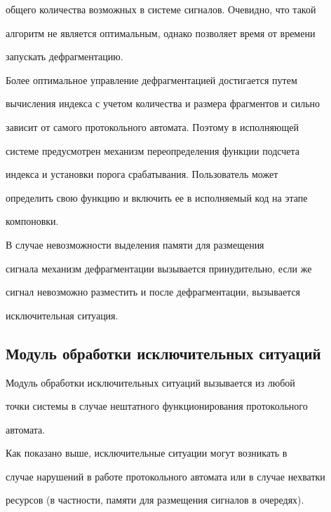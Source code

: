 общего количества возможных в системе сигналов. Очевидно, что такой 


алгоритм не является оптимальным, однако позволяет время от времени 


запускать дефрагментацию.


      


      Более оптимальное управление дефрагментацией достигается путем 


вы\-чис\-ле\-ния индекса с учетом количества и размера фрагментов и сильно 


зависит от самого протокольного автомата. Поэтому в исполняющей 


системе предусмот\-рен механизм переопределения функции подсчета 


индекса и установки порога срабатывания. Пользователь может 


определить свою функцию и включить ее в исполняемый код на этапе 


компоновки.


      


      В случае невозможности выделения памяти для размещения 


сигнала механизм дефрагментации вызывается принудительно, если же 


сигнал невозможно разместить и после дефрагментации, вызывается 


исключительная ситуация.


      


      \subsection{Модуль обработки исключительных ситуаций}


      


      Модуль обработки исключительных ситуаций вызывается из любой 


точки сис\-те\-мы в случае нештатного функционирования протокольного 


автомата.


      


      Как показано выше, исключительные ситуации могут возникать в 


случае нарушений в работе протокольного автомата или в случае нехватки 


ресурсов (в част\-ности, памяти для размещения сигналов в очередях).


